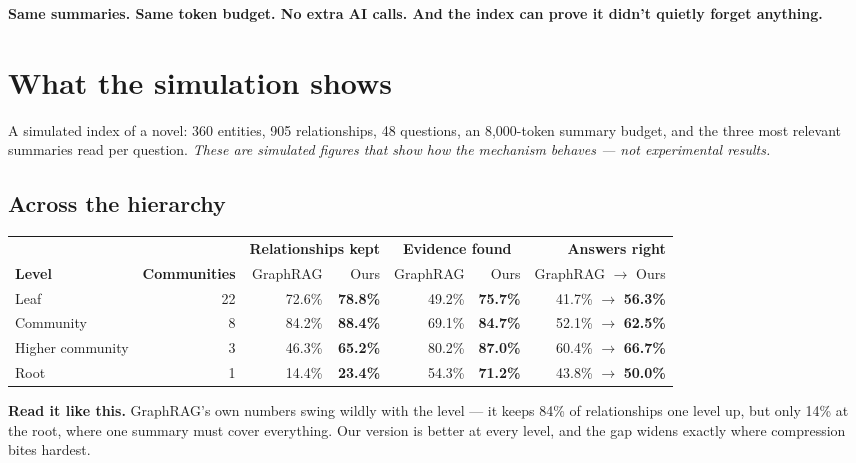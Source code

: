\documentclass[11pt]{article}
\newcommand{\up}[1]{\textcolor{kept}{\textbf{#1}}}
\begin{document}
\begin{keybox}
\textbf{Same summaries. Same token budget. No extra AI calls. And the index can prove it didn't quietly forget anything.}
\end{keybox}

\section{What the simulation shows}

A simulated index of a novel: 360 entities, 905 relationships, 48 questions, an 8{,}000-token summary budget, and the three most relevant summaries read per question. \emph{These are simulated figures that show how the mechanism behaves --- not experimental results.}

\subsection{Across the hierarchy}

\begin{center}\small
\begin{tabular}{lrrrrrr}
\toprule
& & \multicolumn{2}{c}{\textbf{Relationships kept}} & \multicolumn{2}{c}{\textbf{Evidence found}} & \textbf{Answers right} \\
\cmidrule(lr){3-4}\cmidrule(lr){5-6}\cmidrule(lr){7-7}
\textbf{Level} & \textbf{Communities} & GraphRAG & Ours & GraphRAG & Ours & GraphRAG $\rightarrow$ Ours \\
\midrule
Leaf             & 22 & 72.6\% & \up{78.8\%} & 49.2\% & \up{75.7\%} & 41.7\% $\rightarrow$ \up{56.3\%} \\
Community        &  8 & 84.2\% & \up{88.4\%} & 69.1\% & \up{84.7\%} & 52.1\% $\rightarrow$ \up{62.5\%} \\
Higher community &  3 & 46.3\% & \up{65.2\%} & 80.2\% & \up{87.0\%} & 60.4\% $\rightarrow$ \up{66.7\%} \\
Root             &  1 & 14.4\% & \up{23.4\%} & 54.3\% & \up{71.2\%} & 43.8\% $\rightarrow$ \up{50.0\%} \\
\bottomrule
\end{tabular}
\end{center}

\noindent\textbf{Read it like this.} GraphRAG's own numbers swing wildly with the level --- it keeps 84\% of relationships one level up, but only 14\% at the root, where one summary must cover everything. Our version is better at every level, and the gap widens exactly where compression bites hardest.
\end{document}
